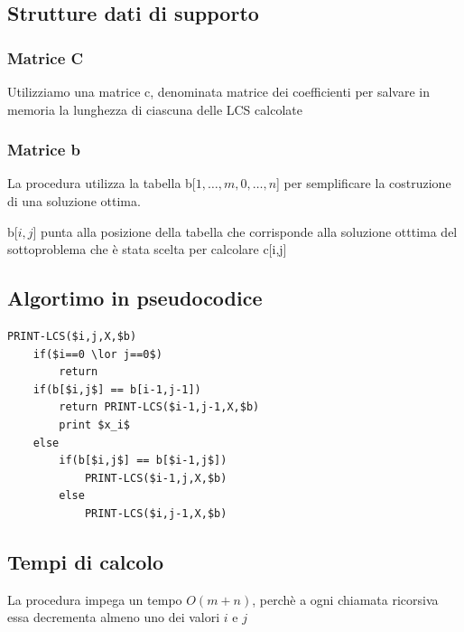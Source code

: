 \subsection{Strutture dati di supporto}
\subsubsection{Matrice C}
Utilizziamo una matrice c, denominata matrice dei coefficienti per salvare in memoria la lunghezza di ciascuna delle LCS calcolate

\subsubsection{Matrice b}
La procedura utilizza la tabella b[$1,\dots,m,0,\dots,n$] per semplificare la costruzione di una soluzione ottima.

b[$i,j$] punta alla posizione della tabella che corrisponde alla soluzione otttima del sottoproblema che è stata scelta per calcolare c[i,j]


\subsection{Algortimo in pseudocodice}
\begin{lstlisting}
PRINT-LCS($i,j,X,$b)
    if($i==0 \lor j==0$)
        return
    if(b[$i,j$] == b[i-1,j-1])
        return PRINT-LCS($i-1,j-1,X,$b)
        print $x_i$
    else
        if(b[$i,j$] == b[$i-1,j$])
            PRINT-LCS($i-1,j,X,$b)
        else
            PRINT-LCS($i,j-1,X,$b)
\end{lstlisting}

\subsection{Tempi di calcolo}
La procedura impega un tempo $O(m+n)$, perchè a ogni chiamata ricorsiva essa decrementa almeno uno dei valori $i$ e $j$


